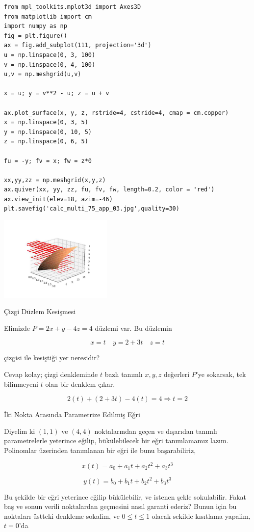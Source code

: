 \documentclass[12pt,fleqn]{article}\usepackage{../../common}
\begin{document}
\begin{verbatim}
from mpl_toolkits.mplot3d import Axes3D
from matplotlib import cm
import numpy as np
fig = plt.figure()
ax = fig.add_subplot(111, projection='3d')
u = np.linspace(0, 3, 100)
v = np.linspace(0, 4, 100)
u,v = np.meshgrid(u,v)

x = u; y = v**2 - u; z = u + v

ax.plot_surface(x, y, z, rstride=4, cstride=4, cmap = cm.copper)
x = np.linspace(0, 3, 5)
y = np.linspace(0, 10, 5)
z = np.linspace(0, 6, 5)

fu = -y; fv = x; fw = z*0

xx,yy,zz = np.meshgrid(x,y,z)
ax.quiver(xx, yy, zz, fu, fv, fw, length=0.2, color = 'red')
ax.view_init(elev=18, azim=-46)
plt.savefig('calc_multi_75_app_03.jpg',quality=30)
\end{verbatim}

\includegraphics[width=15em]{calc_multi_75_app_03.jpg}

Çizgi Düzlem Kesişmesi

Elimizde $P = 2x + y - 4z = 4$ düzlemi var. Bu düzlemin 

$$ x = t \quad y = 2 + 3t \quad z = t$$

çizgisi ile kesiştiği yer neresidir? 

Cevap kolay; çizgi denkleminde $t$ bazlı tanımlı $x,y,z$ değerleri $P$'ye
sokarsak, tek bilinmeyeni $t$ olan bir denklem çıkar, 

$$ 2(t) + (2+3t)-4(t) = 4 \Rightarrow t = 2$$

İki Nokta Arasında Parametrize Edilmiş Eğri

Diyelim ki $(1,1)$ ve $(4,4)$ noktalarından geçen ve dışarıdan tanımlı
parametrelerle yeterince eğilip, bükülebilecek bir eğri tanımlamamız
lazım. Polinomlar üzerinden tanımlanan bir eğri ile bunu başarabiliriz, 

$$
x(t) = a_0 + a_1 t + a_2 t^2 + a_3 t^3
$$

$$
y(t) = b_0 + b_1 t + b_2 t^2 + b_3 t^3
$$

Bu şekilde bir eğri yeterince eğilip bükülebilir, ve istenen şekle
sokulabilir. Fakat baş ve sonun verili noktalardan geçmesini nasıl garanti
ederiz? Bunun için bu noktaları üstteki denkleme sokalim, ve $0 \le t \le
1$ olacak sekilde kısıtlama yapalim, $t=0$'da
\end{document}
